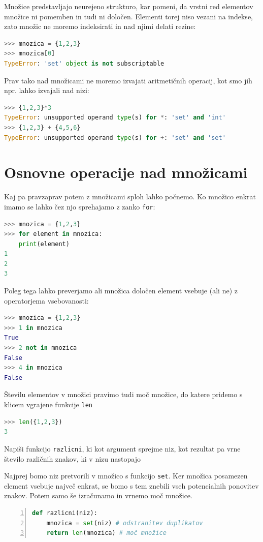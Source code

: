Množice predstavljajo neurejeno strukturo, kar pomeni, da vrstni red elementov množice ni pomemben in tudi ni določen. Elementi torej niso vezani na indekse, zato množic ne moremo indeksirati in nad njimi delati rezine:
\begin{lstlisting}[language=Python]
>>> mnozica = {1,2,3}
>>> mnozica[0]
TypeError: 'set' object is not subscriptable
\end{lstlisting}
Prav tako nad množicami ne moremo izvajati aritmetičnih operacij, kot smo jih npr. lahko izvajali nad nizi:
\begin{lstlisting}[language=Python]
>>> {1,2,3}*3
TypeError: unsupported operand type(s) for *: 'set' and 'int'
>>> {1,2,3} + {4,5,6}
TypeError: unsupported operand type(s) for +: 'set' and 'set'
\end{lstlisting}

\section{Osnovne operacije nad množicami}

Kaj pa pravzaprav potem z množicami sploh lahko počnemo. Ko množico enkrat imamo se lahko čez njo sprehajamo z zanko \texttt{for}:
\begin{lstlisting}[language=Python]
>>> mnozica = {1,2,3}
>>> for element in mnozica:
	print(element)
1
2
3
\end{lstlisting} 
Poleg tega lahko preverjamo ali množica določen element vsebuje (ali ne) z operatorjema vsebovanosti:
\begin{lstlisting}[language=Python]
>>> mnozica = {1,2,3}
>>> 1 in mnozica
True
>>> 2 not in mnozica
False
>>> 4 in mnozica
False
\end{lstlisting}

Številu elementov v množici pravimo tudi moč množice, do katere pridemo s klicem vgrajene funkcije \texttt{len}
\begin{lstlisting}[language=Python]
>>> len({1,2,3})
3
\end{lstlisting}

\begin{zgled}
Napiši funkcijo \texttt{razlicni}, ki kot argument sprejme niz, kot rezultat pa vrne število različnih znakov, ki v nizu nastopajo
\end{zgled}
\begin{resitev}
Najprej bomo niz pretvorili v množico s funkcijo \texttt{set}. Ker množica posamezen element vsebuje največ enkrat, se bomo s tem znebili vseh potencialnih ponovitev znakov. Potem samo še izračunamo in vrnemo moč množice.
\begin{lstlisting}[language=Python,numbers=left]
def razlicni(niz):
    mnozica = set(niz) # odstranitev duplikatov
    return len(mnozica) # moč množice
\end{lstlisting}
\end{resitev}

